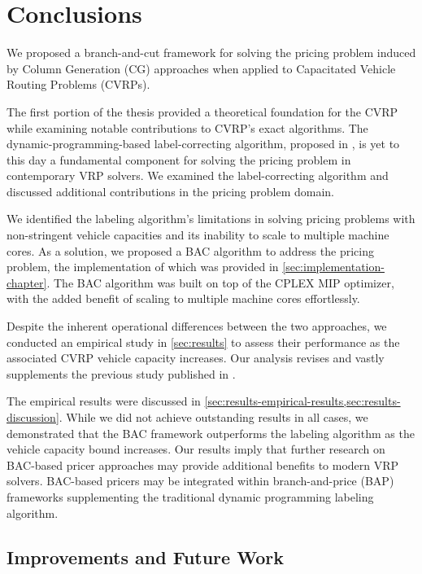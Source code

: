 \chapter{Conclusions}
\label{sec:conclusions}

We proposed a branch-and-cut framework for solving the pricing problem
induced by Column Generation (CG) approaches when applied to
Capacitated Vehicle Routing Problems (CVRPs).

The first portion of the thesis provided a theoretical foundation for the CVRP
while examining notable contributions to CVRP's exact algorithms.
The dynamic-programming-based label-correcting algorithm,
proposed in \textcite{desrochers1992, feillet2004},
is yet to this day a fundamental component for solving the pricing problem
in contemporary VRP solvers.
We examined the label-correcting algorithm
and discussed additional contributions in the pricing problem domain.

\medskip

We identified the labeling algorithm's limitations in solving pricing problems
with non-stringent vehicle capacities
and its inability to scale to multiple machine cores.
As a solution, we proposed a BAC algorithm to address the pricing problem,
the implementation of which was provided in \cref{sec:implementation-chapter}.
The BAC algorithm was built on top of the CPLEX MIP optimizer,
with the added benefit of scaling to multiple machine cores effortlessly.

Despite the inherent operational differences between the two approaches, we conducted an empirical study in \cref{sec:results}
to assess their performance as the associated CVRP vehicle capacity increases.
Our analysis revises and vastly supplements the previous study published in \textcite{jepsen2014}.

\medskip

The empirical results were discussed in \cref{sec:results-empirical-results,sec:results-discussion}.
While we did not achieve outstanding results in all cases,
we demonstrated that the BAC framework outperforms
the labeling algorithm as the vehicle capacity bound increases.
Our results imply that further research on BAC-based pricer approaches
may provide additional benefits to modern VRP solvers.
BAC-based pricers may be integrated within branch-and-price (BAP) frameworks
supplementing the traditional dynamic programming labeling algorithm.

\section{Improvements and Future Work}
\label{sec:conclusions-improvements-and-future-work}

